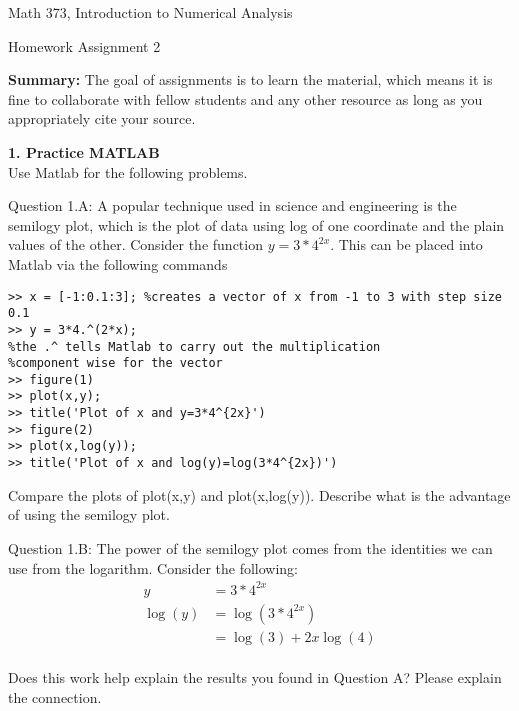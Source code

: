 \documentclass{article}
\def\ds{\displaystyle}
\begin{document}

\large

{\Large Math 373, Introduction to Numerical Analysis}


{\Large Homework Assignment 2} 

{\bf Summary:} {\color{red} The goal of assignments is to learn the material, which means it is fine to collaborate with fellow students and any other resource as long as you appropriately cite your source.}
\par \bigskip \par



{\bf  1. Practice MATLAB} \\
Use Matlab for the following problems. \par \medskip \noindent
%
Question 1.A: A popular technique used in science and engineering is the semilogy plot, which is the plot of data using log of one coordinate and the plain values of the other. Consider the function $\ds y=3*4^{2x}$. This can be placed into Matlab via the following commands
\begin{verbatim}
>> x = [-1:0.1:3]; %creates a vector of x from -1 to 3 with step size 0.1
>> y = 3*4.^(2*x); 
%the .^ tells Matlab to carry out the multiplication 
%component wise for the vector
>> figure(1)
>> plot(x,y);
>> title('Plot of x and y=3*4^{2x}')
>> figure(2)
>> plot(x,log(y));
>> title('Plot of x and log(y)=log(3*4^{2x})')    
\end{verbatim}
\par
Compare the plots of plot(x,y) and plot(x,log(y)). Describe what is the advantage of using the semilogy plot. 
\medskip \par \noindent
%
Question 1.B: The power of the semilogy plot comes from the identities we can use from the logarithm. Consider the following:
\begin{align*}
y &= 3*4^{2x}\\
\log (y) &= \log (3*4^{2x}) \\
 &= \log (3) + 2x \log(4)
\end{align*}
\\
Does this work help explain the results you found in Question A?  Please explain the connection. 
\end{document}
